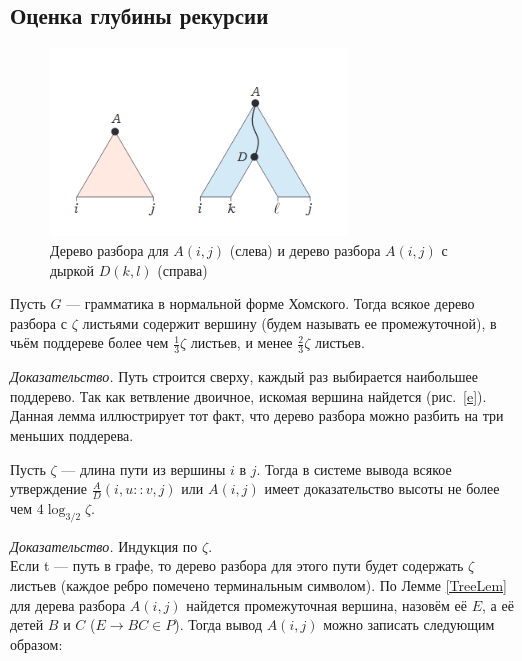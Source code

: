\subsection {Оценка глубины рекурсии}
\begin{figure}[!]
\centering
\includegraphics[width=0.7\textwidth]{Shemetova/trees.png}
\caption{Дерево разбора для $A(i, j)$ (слева) и дерево разбора $A(i, j)$ с дыркой $D(k, l)$ (справа)}
\label{hole}
\end{figure}
\begin{lemmarus}\label{TreeLem}
Пусть $G$ --- грамматика в нормальной форме Хомского. Тогда всякое дерево разбора с $\zeta$ листьями содержит вершину (будем называть ее  промежуточной), в чьём поддереве более чем $\frac{1}{3}\zeta$ листьев, и менее $\frac{2}{3}\zeta$ листьев.
\end{lemmarus}
\textit{Доказательство.}  Путь строится сверху, каждый раз выбирается наибольшее поддерево. Так как ветвление двоичное, искомая вершина найдется (рис.~\ref{e}). Данная лемма иллюстрирует тот факт, что дерево разбора можно разбить на три меньших поддерева.


\begin{lemmarus}\label{Depthlem}
Пусть $\zeta$ --- длина пути из вершины $i$ в $j$. Тогда в системе вывода всякое утверждение  $\frac{A}{D}(i , u :: v , j)$ или $A(i , j)$ имеет доказательство высоты не более чем $4\log_{3/2}\zeta$.
\end{lemmarus}
\textit{Доказательство.}  Индукция по $\zeta$.
\\Если t --- путь в графе, то дерево разбора для этого пути будет содержать $\zeta$ листьев (каждое ребро помечено терминальным символом). По Лемме \ref{TreeLem} для дерева разбора  $A(i, j)$ найдется промежуточная вершина, назовём её $E$, а её детей $B$ и $C$ ($E \rightarrow BC \in P$). Тогда вывод  $A(i , j)$ можно записать следующим образом:
\begin{prooftree}
\end{prooftree}

